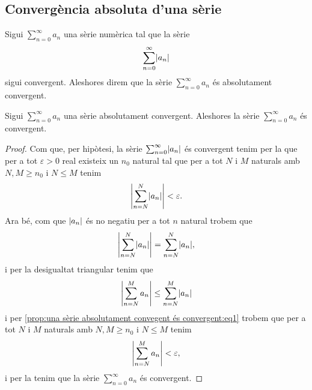 \documentclass[../../Main.tex]{subfiles}
\begin{document}
	\subsection{Convergència absoluta d'una sèrie}
	\begin{definition}
		\label{def:convergència absoluta d'una sèrie}
		Sigui \(\sum_{n=0}^{\infty}a_{n}\) una sèrie numèrica tal que la sèrie
		\[\sum_{n=0}^{\infty}\abs{a_{n}}\]
		sigui convergent. Aleshores direm que la sèrie \(\sum_{n=0}^{\infty}a_{n}\) és absolutament convergent.
	\end{definition}
	\begin{proposition}
		\label{prop:una sèrie absolutament convergent és convergent}
		Sigui \(\sum_{n=0}^{\infty}a_{n}\) una sèrie absolutament convergent. Aleshores la sèrie \(\sum_{n=0}^{\infty}a_{n}\) és convergent.
		\begin{proof}
			Com que, per hipòtesi, la sèrie \(\sum_{n=0}^{\infty}\abs{a_{n}}\) és convergent tenim per la  que per a tot \(\varepsilon>0\) real existeix un \(n_{0}\) natural tal que per a tot \(N\) i \(M\) naturals amb \(N,M\geq n_{0}\) i \(N\leq M\) tenim
			\begin{equation}
				\label{prop:una sèrie absolutament convegent és convergent:eq1}
				\abs{\sum_{n=N}^{N}\abs{a_{n}}}<\varepsilon.
			\end{equation}
			Ara bé, com que \(\abs{a_{n}}\) és no negatiu per a tot \(n\) natural trobem que
			\[\abs{\sum_{n=N}^{N}\abs{a_{n}}}=\sum_{n=N}^{N}\abs{a_{n}},\]
			i per la desigualtat triangular %
			tenim que
			\[\abs{\sum_{n=N}^{M}a_{n}}\leq\sum_{n=N}^{M}\abs{a_{n}}\]
			i per \eqref{prop:una sèrie absolutament convegent és convergent:eq1} trobem que per a tot \(N\) i \(M\) naturals amb \(N,M\geq n_{0}\) i \(N\leq M\) tenim
			\[\abs{\sum_{n=N}^{M}a_{n}}<\varepsilon,\]
			i per la  tenim que la sèrie \(\sum_{n=0}^{\infty}a_{n}\) és convergent.
		\end{proof}
	\end{proposition}
\end{document}
